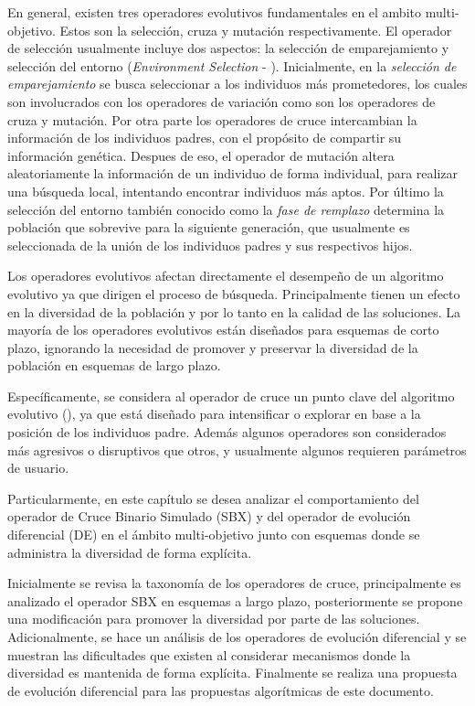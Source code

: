 En general, existen tres operadores evolutivos fundamentales en el ambito multi-objetivo. 
%
Estos son la selección, cruza y mutación respectivamente.
%
El operador de selección usualmente incluye dos aspectos: la selección de emparejamiento y selección del entorno (\textit{Environment Selection} - \cite{zitzler2001spea2}).
%
Inicialmente, en la \textit{selección de emparejamiento} se busca seleccionar a los individuos más prometedores, los cuales son involucrados con los operadores de variación como son los operadores de cruza y mutación.
%
Por otra parte los operadores de cruce intercambian la información de los individuos padres, con el propósito de compartir su información genética.
%
Despues de eso, el operador de mutación altera aleatoriamente la información de un individuo de forma individual, para realizar una búsqueda local, intentando encontrar individuos más aptos.
%
Por último la selección del entorno también conocido como la \textit{fase de remplazo} determina la población que sobrevive para la siguiente generación, que usualmente es seleccionada de la unión de los individuos padres y sus respectivos hijos.


Los operadores evolutivos afectan directamente el desempeño de un algoritmo evolutivo ya que dirigen el proceso de búsqueda.
%
Principalmente tienen un efecto en la diversidad de la población y por lo tanto en la calidad de las soluciones.
%
La mayoría de los operadores evolutivos están diseñados para esquemas de corto plazo, ignorando la necesidad de promover y preservar la diversidad de la población en esquemas de largo plazo.
%

Específicamente, se considera al operador de cruce un punto clave del algoritmo evolutivo (\cite{Joel:OperatorAHX}), ya que está diseñado para intensificar o explorar en base a la posición de los individuos padre.
%
Además algunos operadores son considerados más agresivos o disruptivos que otros, y usualmente algunos requieren parámetros de usuario.

%
Particularmente, en este capítulo se desea analizar el comportamiento del operador de Cruce Binario Simulado (SBX) y del operador de evolución diferencial (DE) en el ámbito multi-objetivo junto con esquemas donde se administra la diversidad de forma explícita.
%

%
Inicialmente se revisa la taxonomía de los operadores de cruce, principalmente es analizado el operador SBX en esquemas a largo plazo, posteriormente se propone una modificación para promover la diversidad por parte de las soluciones.
%
Adicionalmente, se hace un análisis de los operadores de evolución diferencial y se muestran las dificultades que existen al considerar mecanismos donde la diversidad es mantenida de forma explícita.
%
Finalmente se realiza una propuesta de evolución diferencial para las propuestas algorítmicas de este documento.

